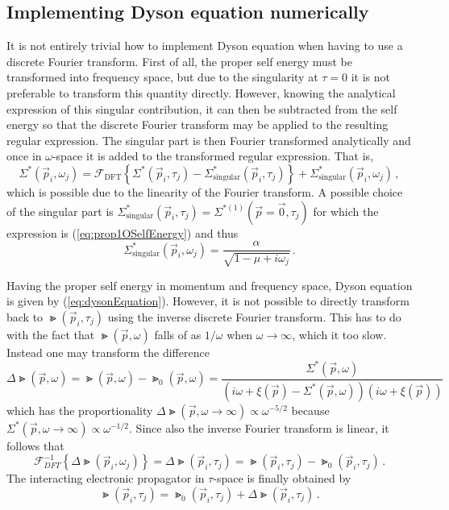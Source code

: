 \subsection{Implementing Dyson equation numerically}

It is not entirely trivial how to implement Dyson equation when having to use a discrete Fourier transform. First of all, the proper self energy must be transformed into frequency space, but due to the singularity at $ \tau = 0 $ it is not preferable to transform this quantity directly. However, knowing the analytical expression of this singular contribution, it can then be subtracted from the self energy so that the discrete Fourier transform may be applied to the resulting regular expression. The singular part is then Fourier transformed analytically and once in $ \omega $-space it is added to the transformed regular expression. That is,
\begin{equation}
	\Sigma^{*}(\vec p_i, \omega_j)
	= \mathcal{F}_\text{DFT} \left\{ \Sigma^{*}(\vec p_i, \tau_j) - \Sigma^{*}_\text{singular}(\vec p_i, \tau_j) \right\}
	+ \Sigma^{*}_\text{singular}(\vec p_i, \omega_j) \,,
\end{equation}
which is possible due to the linearity of the Fourier transform. A possible choice of the singular part is $ \Sigma^{*}_\text{singular}(\vec p_i, \tau_j) = \Sigma^{*(1)}(\vec p = \vec 0, \tau_j) $ for which the expression is (\ref{eq:prop1OSelfEnergy}) and thus
\begin{equation}
	\Sigma^{*}_\text{singular}(\vec p_i, \omega_j) = \frac{\alpha}{\sqrt{1 - \mu + i\omega_j}} \,.
\end{equation}

Having the proper self energy in momentum and frequency space, Dyson equation is given by (\ref{eq:dysonEquation}). However, it is not possible to directly transform back to $ \Gt(\vec p_i, \tau_j) $ using the inverse discrete Fourier transform. This has to do with the fact that $ \Gt(\vec p, \omega) $ falls of as $ 1/\omega $ when $ \omega \rightarrow \infty $, which it too slow. Instead one may transform the difference
\begin{equation}
	\Delta \Gt(\vec p, \omega)
	= \Gt(\vec p, \omega) - \Gt_0(\vec p, \omega)
	= \frac{\Sigma^*(\vec p, \omega)}{\left( i \omega + \xi(\vec p) - \Sigma^*(\vec p, \omega) \right) \left( i \omega + \xi(\vec p) \right)}
\end{equation}
which has the proportionality $ \Delta \Gt(\vec p, \omega \rightarrow \infty) \propto \omega^{-5/2} $ because $ \Sigma^*(\vec p, \omega \rightarrow \infty) \propto \omega^{-1/2} $. Since also the inverse Fourier transform is linear, it follows that
\begin{equation}
	\mathcal{F}^{-1}_{DFT} \left\{ \Delta \Gt(\vec p_i, \omega_j) \right\} = \Delta \Gt(\vec p_i, \tau_j) = \Gt(\vec p_i, \tau_j) - \Gt_0(\vec p_i, \tau_j) \,.
\end{equation}
The interacting electronic propagator in $ \tau $-space is finally obtained by
\begin{equation}
	\Gt(\vec p_i, \tau_j) = \Gt_0(\vec p_i, \tau_j) + \Delta \Gt(\vec p_i, \tau_j) \,.
\end{equation}

